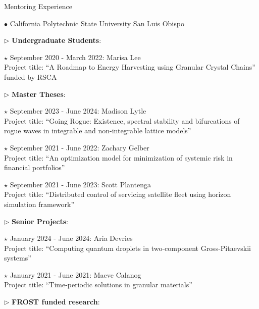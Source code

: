 \documentclass[10pt]{article} %
\newenvironment{outerlist}[1][\enskip\textbullet]%
        {\begin{itemize}[#1]}{\end{itemize}%
         \vspace{-.6\baselineskip}}
\newenvironment{innerlist}[1][\enskip\textbullet]%
        {\begin{compactitem}[#1]}{\end{compactitem}}
\begin{document}
\begin{section}{Mentoring Experience}
\begin{outerlist}

\item[$\bullet$] \vskip -7mm California Polytechnic State University San Luis Obispo

\begin{innerlist}
\item[$\triangleright$] \textbf{Undergraduate Students}:
\begin{innerlist}
\item[$\star$] September 2020 - March 2022: Marisa Lee\\
Project title: ``A Roadmap to Energy Harvesting using Granular Crystal Chains'' funded by RSCA
\end{innerlist}
\item[$\triangleright$] \textbf{Master Theses}:
\begin{innerlist}
\item[$\star$] September 2023 - June 2024: Madison Lytle\\
Project title: ``Going Rogue: Existence, spectral stability and bifurcations of rogue waves in
integrable and non-integrable lattice models''
\item[$\star$] September 2021 - June 2022: Zachary Gelber\\
Project title: ``An optimization model for minimization of systemic risk in financial portfolios''
\item[$\star$] September 2021 - June 2023: Scott Plantenga\\
Project title: ``Distributed control of servicing satellite fleet using horizon simulation framework''
\end{innerlist}
\item[$\triangleright$] \textbf{Senior Projects}:
\begin{innerlist}
\item[$\star$] January 2024 - June 2024: Aria Devries\\
Project title: ``Computing quantum droplets in two-component Gross-Pitaevskii systems''
\item[$\star$] January 2021 - June 2021: Maeve Calanog\\
Project title: ``Time-periodic solutions in granular materials''
\end{innerlist}
\item[$\triangleright$] \textbf{FROST funded research}:
\begin{innerlist}

\end{innerlist}
\end{innerlist}
\end{outerlist}
\end{section}
\end{document}
